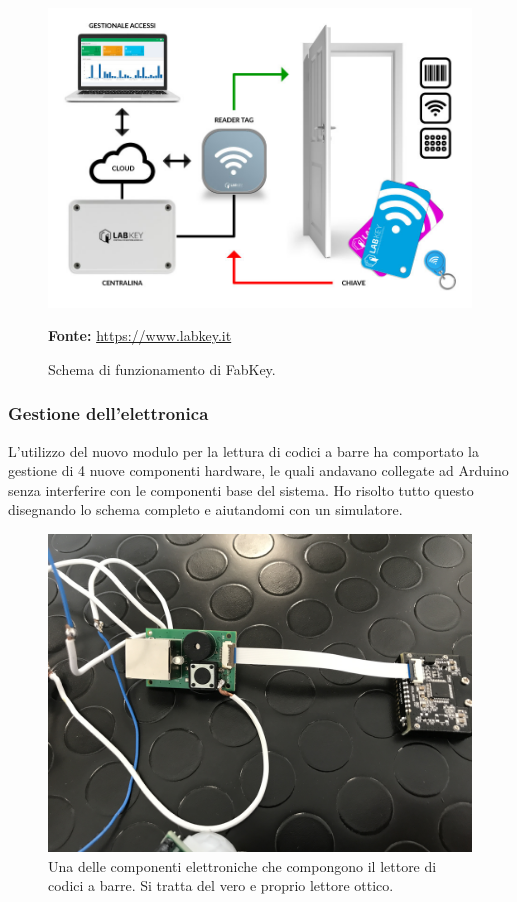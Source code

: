 \begin{figure}[H]
	\begin{center}
	\includegraphics[scale=0.4]{immagini/schema_labkey.jpg}
	\caption{Schema di funzionamento di FabKey.}
	\small{\textbf{Fonte:} \url{https://www.labkey.it}}
	\end{center}
\end{figure}

\subsubsection{Gestione dell'elettronica}
L'utilizzo del nuovo modulo per la lettura di codici a barre ha comportato la gestione di 4 nuove componenti hardware, le quali andavano collegate ad Arduino senza interferire con le componenti base del sistema.
Ho risolto tutto questo disegnando lo schema completo e aiutandomi con un simulatore.

\begin{figure}[H]
	\begin{center}
	\includegraphics[scale=0.065]{immagini/lettore_barcode.jpg}
	\caption{Una delle componenti elettroniche che compongono il lettore di codici a barre. Si tratta del vero e proprio lettore ottico.}
	\end{center}
\end{figure}


